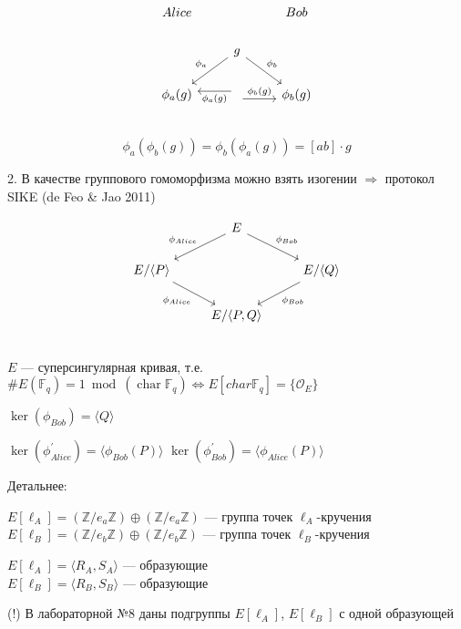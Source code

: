 \documentclass[12pt, final]{article}
\newcommand{\Z}{{{\mathbb Z}}}
\newcommand{\F}{{{\mathbb F}}}
\newcommand{\bigO}{\mathcal{O}}
\theoremstyle{definition}
\theoremstyle{definition}
\theoremstyle{definition}
\begin{document}
\[
\begin{tikzcd}
    Alice & & Bob \\
    & \arrow{ld}[swap]{\phi_a} g \arrow{rd}{\phi_b}  \\
    \phi_a(g) & \arrow[yshift=-0.7ex]{r}{\phi_b(g)} \arrow[yshift=0.7ex]{l}{\phi_a(g)}  & \phi_b(g)\\
\end{tikzcd}
\]
\[
\phi_a(\phi_b(g)) = \phi_b(\phi_a(g)) = [ab]\cdot g
\]

2. В качестве группового гомоморфизма можно взять изогении $\Rightarrow$ протокол SIKE (de Feo \& Jao 2011)
 
\[
\begin{tikzcd}
    &\arrow{ld}[swap]{\phi_{Alice}} E  \arrow{rd}{\phi_{Bob}} &\\
    E/\langle P\rangle\arrow{rd}[swap]{\phi_{Alice}}  &  & \arrow{ld}{\phi_{Bob}}  E/\langle Q\rangle\\
    & E/\langle P,Q\rangle &\\
\end{tikzcd}
\]
$E$ — суперсингулярная кривая, т.е. $\#E(\F_q)=1\bmod  (\operatorname{char} \F_q) \Leftrightarrow E[char\F_q] = \{\bigO_E\}$

$\ker(\phi_{Bob})=\langle Q\rangle$

$\ker(\phi^{'}_{Alice})=\langle\phi_{Bob}(P)\rangle$
$\ker(\phi^{'}_{Bob})=\langle\phi_{Alice}(P)\rangle$

Детальнее:

$E[\ell_A] = (\Z/e_a\Z) \oplus (\Z/e_a\Z)$ — группа точек $\ell_A$-кручения \\
$E[\ell_B] = (\Z/e_b\Z) \oplus (\Z/e_b\Z)$ — группа точек $\ell_B$-кручения

$E[\ell_A]=\langle R_A, S_A\rangle$ — образующие\\
$E[\ell_B]=\langle R_B, S_B\rangle$ — образующие

(!) В лабораторной №8 даны подгруппы $E[\ell_A]$, $E[\ell_B]$ с одной образующей
\end{document}
